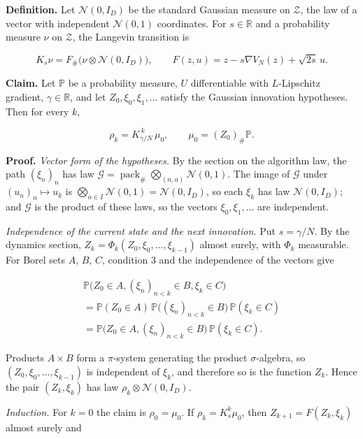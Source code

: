\documentclass[11pt,a4paper]{article}
\begin{document}
\textbf{Definition.} Let \(\mathcal N(0,I_D)\) be the standard Gaussian measure on \(\mathcal Z\), the law of a vector with independent \(\mathcal N(0,1)\) coordinates. For \(s\in\mathbb R\) and a probability measure \(\nu\) on \(\mathcal Z\), the Langevin transition is


\[K_s\nu=F_\#\bigl(\nu\otimes\mathcal N(0,I_D)\bigr),\qquad F(z,u)=z-s\nabla V_N(z)+\sqrt{2s}\,u .\]


\textbf{Claim.} Let \(\mathbb P\) be a probability measure, \(U\) differentiable with \(L\)-Lipschitz gradient, \(\gamma\in\mathbb R\), and let \(Z_0,\xi_0,\xi_1,\dots\) satisfy the Gaussian innovation hypotheses. Then for every \(k\),


\[\rho_k=K_{\gamma/N}^{\,k}\,\mu_0,\qquad\mu_0=(Z_0)_\#\mathbb P .\]


\textbf{Proof.} \emph{Vector form of the hypotheses.} By the section on the algorithm law, the path \((\xi_n)_n\) has law \(\mathcal G=\operatorname{pack}_\#\bigotimes_{(n,a)}\mathcal N(0,1)\). The image of \(\mathcal G\) under \((u_n)_n\mapsto u_k\) is \(\bigotimes_{a\in I}\mathcal N(0,1)=\mathcal N(0,I_D)\), so each \(\xi_k\) has law \(\mathcal N(0,I_D)\); and \(\mathcal G\) is the product of these laws, so the vectors \(\xi_0,\xi_1,\dots\) are independent.




\emph{Independence of the current state and the next innovation.} Put \(s=\gamma/N\). By the dynamics section, \(Z_k=\Phi_k(Z_0,\xi_0,\dots,\xi_{k-1})\) almost surely, with \(\Phi_k\) measurable. For Borel sets \(A\), \(B\), \(C\), condition 3 and the independence of the vectors give


\[\begin{gathered}\mathbb P\bigl(Z_0\in A,(\xi_n)_{n<k}\in B,\xi_k\in C\bigr)\\=\mathbb P(Z_0\in A)\,\mathbb P\bigl((\xi_n)_{n<k}\in B\bigr)\,\mathbb P(\xi_k\in C)\\=\mathbb P\bigl(Z_0\in A,(\xi_n)_{n<k}\in B\bigr)\,\mathbb P(\xi_k\in C).\end{gathered}\]


Products \(A\times B\) form a \(\pi\)-system generating the product \(\sigma\)-algebra, so \((Z_0,\xi_0,\dots,\xi_{k-1})\) is independent of \(\xi_k\), and therefore so is the function \(Z_k\). Hence the pair \((Z_k,\xi_k)\) has law \(\rho_k\otimes\mathcal N(0,I_D)\).




\emph{Induction.} For \(k=0\) the claim is \(\rho_0=\mu_0\). If \(\rho_k=K_s^k\mu_0\), then \(Z_{k+1}=F(Z_k,\xi_k)\) almost surely and
\end{document}
